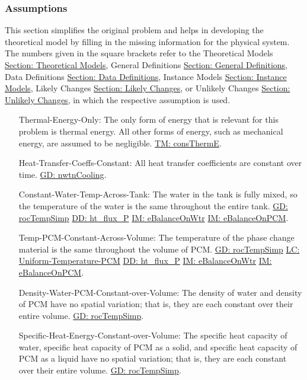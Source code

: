 \documentclass[12pt]{article}
\begin{document}
\subsubsection{Assumptions}
\label{Sec:Assumps}
This section simplifies the original problem and helps in developing the theoretical model by filling in the missing information for the physical system. The numbers given in the square brackets refer to the Theoretical Models \hyperref[Sec:TMs]{Section: Theoretical Models}, General Definitions \hyperref[Sec:GDs]{Section: General Definitions}, Data Definitions \hyperref[Sec:DDs]{Section: Data Definitions}, Instance Models \hyperref[Sec:IMs]{Section: Instance Models}, Likely Changes \hyperref[Sec:LCs]{Section: Likely Changes}, or Unlikely Changes \hyperref[Sec:UCs]{Section: Unlikely Changes}, in which the respective assumption is used.
\begin{itemize}
\item[Thermal-Energy-Only:\phantomsection\label{assumpTEO}]The only form of energy that is relevant for this problem is thermal energy. All other forms of energy, such as mechanical energy, are assumed to be negligible. \hyperref[TM:consThermE]{TM: consThermE}.
\item[Heat-Transfer-Coeffs-Constant:\phantomsection\label{assumpHTCC}]All heat transfer coefficients are constant over time. \hyperref[GD:nwtnCooling]{GD: nwtnCooling}.
\item[Constant-Water-Temp-Across-Tank:\phantomsection\label{assumpCWTAT}]The water in the tank is fully mixed, so the temperature of the water is the same throughout the entire tank. \hyperref[GD:rocTempSimp]{GD: rocTempSimp} \hyperref[DD:ht.flux.P]{DD: ht\_flux\_P} \hyperref[IM:eBalanceOnWtr]{IM: eBalanceOnWtr} \hyperref[IM:eBalanceOnPCM]{IM: eBalanceOnPCM}.
\item[Temp-PCM-Constant-Across-Volume:\phantomsection\label{assumpTPCAV}]The temperature of the phase change material is the same throughout the volume of PCM. \hyperref[GD:rocTempSimp]{GD: rocTempSimp} \hyperref[likeChgUTP]{LC: Uniform-Temperature-PCM} \hyperref[DD:ht.flux.P]{DD: ht\_flux\_P} \hyperref[IM:eBalanceOnWtr]{IM: eBalanceOnWtr} \hyperref[IM:eBalanceOnPCM]{IM: eBalanceOnPCM}.
\item[Density-Water-PCM-Constant-over-Volume:\phantomsection\label{assumpDWPCoV}]The density of water and density of PCM have no spatial variation; that is, they are each constant over their entire volume. \hyperref[GD:rocTempSimp]{GD: rocTempSimp}.
\item[Specific-Heat-Energy-Constant-over-Volume:\phantomsection\label{assumpSHECov}]The specific heat capacity of water, specific heat capacity of PCM as a solid, and specific heat capacity of PCM as a liquid have no spatial variation; that is, they are each constant over their entire volume. \hyperref[GD:rocTempSimp]{GD: rocTempSimp}.

\end{itemize}
\end{document}
